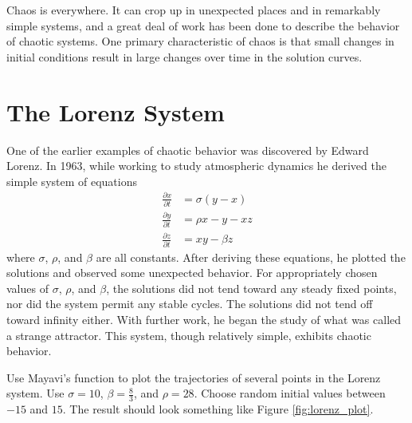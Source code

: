 \label{lab:lorenz}


Chaos is everywhere.
It can crop up in unexpected places and in remarkably simple systems, and a great deal of work has been done to describe the behavior of chaotic systems.
One primary characteristic of chaos is that small changes in initial conditions result in large changes over time in the solution curves.

\section*{The Lorenz System}
One of the earlier examples of chaotic behavior was discovered by Edward Lorenz.
In 1963, while working to study atmospheric dynamics he derived the simple system of equations
\begin{align*}
\frac{\partial x}{\partial t} &= \sigma \left(y - x\right) \\
\frac{\partial y}{\partial t} &= \rho x - y - x z \\
\frac{\partial z}{\partial t} &= x y - \beta z
\end{align*}
where $\sigma$, $\rho$, and $\beta$ are all constants.
After deriving these equations, he plotted the solutions and observed some unexpected behavior.
For appropriately chosen values of $\sigma$, $\rho$, and $\beta$, the solutions did not tend toward any steady fixed points, nor did the system permit any stable cycles.
The solutions did not tend off toward infinity either.
With further work, he began the study of what was called a strange attractor.
This system, though relatively simple, exhibits chaotic behavior.

\begin{problem}
\label{prob:lorenz_basic}
Use Mayavi's  function to plot the trajectories of several points in the Lorenz system.
Use $\sigma = 10$, $\beta = \frac{8}{3}$, and $\rho = 28$.
Choose random initial values between $-15$ and $15$.
The result should look something like Figure \ref{fig:lorenz_plot}.
\end{problem}

